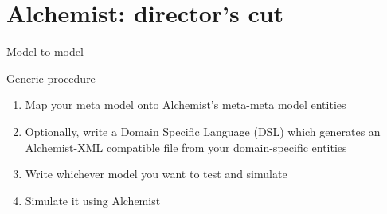 \documentclass[presentation]{beamer}\mode<presentation>{\usetheme{sapere}}
\begin{document}

\section*{Alchemist: director's cut}

\begin{frame}{Model to model}
\begin{block}{Generic procedure}
\begin{enumerate}
 \item Map your meta model onto Alchemist's meta-meta model entities
 \item Optionally, write a Domain Specific Language (DSL) which generates an Alchemist-XML compatible file from your domain-specific entities
 \item Write whichever model you want to test and simulate
 \item Simulate it using Alchemist
\end{enumerate}
\end{block}
\end{frame}
\end{document}
